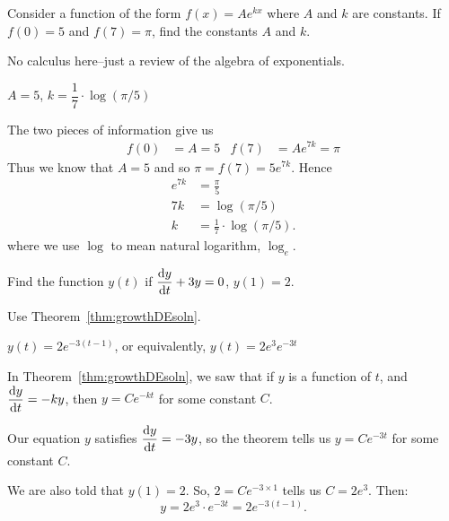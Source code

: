 \begin{question}[2015Q]
Consider a function of the form $f(x) = A e^{kx}$ where $A$ and $k$ are constants.
If $f(0)=5$ and $f(7)=\pi$, find the constants $A$ and $k$.
\end{question}
\begin{hint} No calculus here--just a review of the algebra of exponentials.
\end{hint}
\begin{answer}  $A=5$, $k = \dfrac{1}{7} \cdot \log\left(\pi/5\right)$
\end{answer}
\begin{solution}
The two pieces of information give us
\begin{align*}
  f(0) &= A = 5 & f(7) &= A e^{7k}=\pi
\end{align*}
Thus we know that $A=5$ and so $\pi = f(7) = 5e^{7k}$. Hence
\begin{align*}
  e^{7k} &= \frac{\pi}{5} \\
  7k &= \log(\pi/5) \\
  k &= \frac{1}{7} \cdot \log(\pi/5).
\end{align*}
where we use $\log$ to mean natural logarithm, $\log_e$.
\end{solution}



\begin{question}[2007H]
 Find the function $y(t)$ if $\ds\diff{y}{t} +3y = 0$, $y(1) = 2$.
\end{question}
\begin{hint}
Use Theorem~\ref*{thm:growthDEsoln}.
\end{hint}
\begin{answer}
$y(t)=2e^{-3(t-1)}$, or equivalently, $y(t)=2e^3e^{-3t}$
\end{answer}
\begin{solution}
In Theorem~\ref*{thm:growthDEsoln}, we saw that if $y$ is a function of $t$, and
$\ds\diff{y}{t}=-ky$, then
$y=Ce^{-kt}$ for some constant $C$.

Our equation $y$ satisfies $\ds\diff{y}{t}=-3y$, so the theorem tells us $y=Ce^{-3t}$ for some constant $C$.

We are also told that $y(1)=2$. So, $2=Ce^{-3 \times 1}$ tells us $C=2e^3$. Then:
\[y=2e^{3}\cdot e^{-3t}=2e^{-3(t-1)}.\]
\end{solution}




